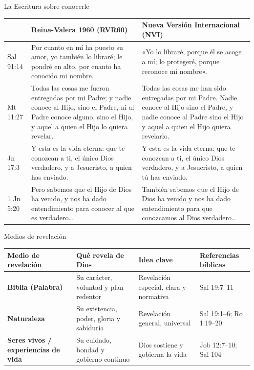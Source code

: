 \documentclass[hyperref={bookmarks=false},aspectratio=169]{beamer}
\newcommand{\destacar}[1]{\textbf{\textcolor{azulp}{#1}}}
\begin{document}
\begin{frame}{La Escritura sobre conocerle}
\tiny
\begin{tabular}{@{}P{1.2cm} P{4.9cm} P{4.9cm}@{}}
\toprule
 & \textbf{Reina-Valera 1960 (RVR60)} & \textbf{Nueva Versión Internacional (NVI)} \\ \midrule
Sal 91:14 & Por cuanto en mí ha puesto su amor, yo también lo libraré; le pondré en alto, por cuanto ha conocido mi nombre. & «Yo lo libraré, porque él se acoge a mí; lo protegeré, porque reconoce mi nombre». \\
Mt 11:27 & Todas las cosas me fueron entregadas por mi Padre; y nadie conoce al Hijo, sino el Padre, ni al Padre conoce alguno, sino el Hijo, y aquel a quien el Hijo lo quiera revelar. & Todas las cosas me han sido entregadas por mi Padre. Nadie conoce al Hijo sino el Padre, y nadie conoce al Padre sino el Hijo y aquel a quien el Hijo quiera revelarlo. \\
Jn 17:3 & Y esta es la vida eterna: que te conozcan a ti, el único Dios verdadero, y a Jesucristo, a quien has enviado. & Y esta es la vida eterna: que te conozcan a ti, el único Dios verdadero, y a Jesucristo, a quien tú has enviado. \\
1 Jn 5:20 & Pero sabemos que el Hijo de Dios ha venido, y nos ha dado entendimiento para conocer al que es verdadero… & También sabemos que el Hijo de Dios ha venido y nos ha dado entendimiento para que conozcamos al Dios verdadero… \\ \bottomrule
\end{tabular}
\end{frame}

\begin{frame}{Medios de revelación}
\scriptsize
\begin{tabular}{@{}P{2.3cm} P{3.0cm} P{3.0cm} P{2.4cm}@{}}
\toprule
\textbf{Medio de revelación} & \textbf{Qué revela de Dios} & \textbf{Idea clave} & \textbf{Referencias bíblicas} \\ \midrule
\destacar{Biblia (Palabra)} & Su carácter, voluntad y plan redentor & Revelación especial, clara y normativa & Sal 19:7–11 \\
\destacar{Naturaleza} & Su existencia, poder, gloria y sabiduría & Revelación general, universal & Sal 19:1–6; Ro 1:19–20 \\
\destacar{Seres vivos / experiencias de vida} & Su cuidado, bondad y gobierno continuo & Dios sostiene y gobierna la vida & Job 12:7–10; Sal 104 \\ \bottomrule
\end{tabular}
\end{frame}
\end{document}
